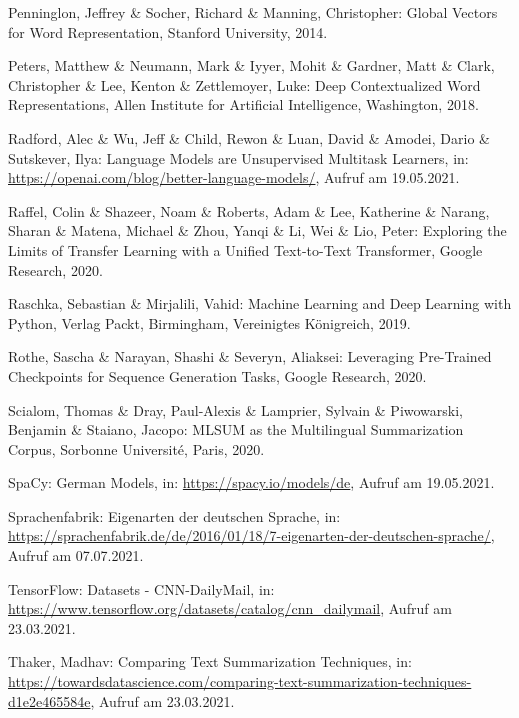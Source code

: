 \begin{thebibliography}{104}
Penninglon, Jeffrey \& Socher, Richard \& Manning, Christopher: Global Vectors for Word Representation, Stanford University, 2014.

Peters, Matthew \& Neumann, Mark \& Iyyer, Mohit \& Gardner, Matt \& Clark, Christopher \& Lee, Kenton \& Zettlemoyer, Luke: Deep Contextualized Word Representations, Allen Institute for Artificial Intelligence, Washington, 2018.

Radford, Alec \& Wu, Jeff \& Child, Rewon \& Luan, David \& Amodei, Dario \& Sutskever, Ilya: Language Models are Unsupervised Multitask Learners, in: \url{https://openai.com/blog/better-language-models/}, Aufruf am 19.05.2021.

Raffel, Colin \& Shazeer, Noam \& Roberts, Adam \& Lee, Katherine \& Narang, Sharan \& Matena, Michael \& Zhou, Yanqi \& Li, Wei \& Lio, Peter: Exploring the Limits of Transfer Learning with a Unified Text-to-Text Transformer, Google Research, 2020.

Raschka, Sebastian \& Mirjalili, Vahid: Machine Learning and Deep Learning with Python, Verlag Packt, Birmingham, Vereinigtes Königreich, 2019.

Rothe, Sascha \& Narayan, Shashi \& Severyn, Aliaksei: Leveraging Pre-Trained Checkpoints for Sequence Generation Tasks, Google Research, 2020.

Scialom, Thomas \& Dray, Paul-Alexis \& Lamprier, Sylvain \& Piwowarski, Benjamin \& Staiano, Jacopo: MLSUM as the Multilingual Summarization Corpus, Sorbonne Université, Paris, 2020.

SpaCy: German Models, in: \url{https://spacy.io/models/de}, Aufruf am 19.05.2021.

Sprachenfabrik: Eigenarten der deutschen Sprache, in: \url{https://sprachenfabrik.de/de/2016/01/18/7-eigenarten-der-deutschen-sprache/}, Aufruf am 07.07.2021.

TensorFlow: Datasets - CNN-DailyMail, in: \url{https://www.tensorflow.org/datasets/catalog/cnn_dailymail}, Aufruf am 23.03.2021.

Thaker, Madhav: Comparing Text Summarization Techniques, in: \url{https://towardsdatascience.com/comparing-text-summarization-techniques-d1e2e465584e}, Aufruf am 23.03.2021.


\end{thebibliography}
